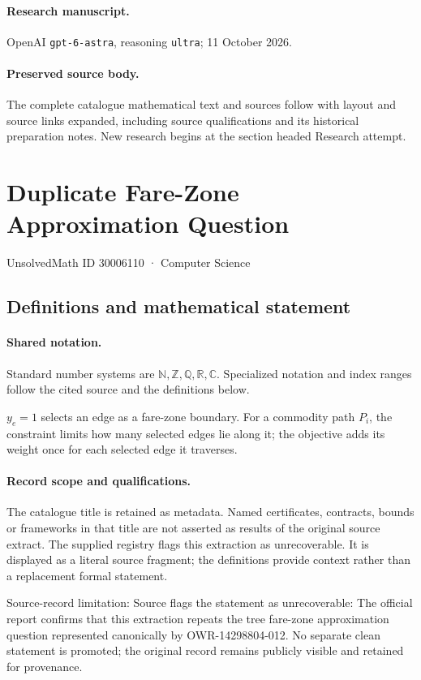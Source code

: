 \documentclass[11pt]{article}
\begin{document}
\paragraph{Research manuscript.} OpenAI \texttt{gpt-6-astra}, reasoning \texttt{ultra}; 11 October 2026.
\paragraph{Preserved source body.} The complete catalogue mathematical text and sources follow with layout and source links expanded, including source qualifications and its historical preparation notes. New research begins at the section headed Research attempt.

\section{Duplicate Fare-Zone Approximation Question}\label{30006110}
{\small UnsolvedMath ID 30006110 · Computer Science}
\subsection{Definitions and mathematical statement}

\paragraph{Shared notation.}Standard number systems are $\mathbb N,\mathbb Z,\mathbb Q,\mathbb R,\mathbb C$. Specialized notation and index ranges follow the cited source and the definitions below.


$y_e=1$ selects an edge as a fare-zone boundary. For a commodity path $P_i$, the constraint limits how many selected edges lie along it; the objective adds its weight once for each selected edge it traverses.
\paragraph{Record scope and qualifications.}
The catalogue title is retained as metadata. Named certificates, contracts, bounds or frameworks in that title are not asserted as results of the original source extract.
The supplied registry flags this extraction as unrecoverable. It is displayed as a literal source fragment; the definitions provide context rather than a replacement formal statement.

Source-record limitation: Source flags the statement as unrecoverable: The official report confirms that this extraction repeats the tree fare-zone approximation question represented canonically by OWR-14298804-012. No separate clean statement is promoted; the original record remains publicly visible and retained for provenance.
\end{document}
